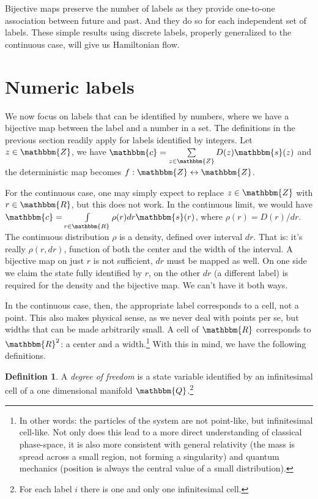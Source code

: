 \documentclass[aps,pra,10pt,twocolumn,floatfix,nofootinbib]{revtex4-1}
\theoremstyle{definition}
\newtheorem{defn}[thm]{Definition}
\begin{document}
Bijective maps preserve the number of labels as they provide one-to-one association between future and past. And they do so for each independent set of labels. These simple results using discrete labels, properly generalized to the continuous case, will give us Hamiltonian flow.

\section{Numeric labels}

We now focus on labels that can be identified by numbers, where we have a bijective map between the label and a number in a set. The definitions in the previous section readily apply for labels identified by integers. Let $z \in \mathbbm{Z}$, we have $\mathbbm{c}=\sum\limits_{z \in \mathbbm{Z}} D(z) \mathbbm{s}(z)$ and the deterministic map becomes $f:\mathbbm{Z} \leftrightarrow \mathbbm{Z}$.

For the continuous case, one may simply expect to replace $z \in \mathbbm{Z}$ with $r \in \mathbbm{R}$, but this does not work. In the continuous limit, we would have $\mathbbm{c}=\int\limits_{r \in \mathbbm{R}} \rho(r) dr \mathbbm{s}(r)$, where $\rho(r) = D(r) / dr$. The continuous distribution $\rho$ is a density, defined over interval $dr$. That is: it's really $\rho(r, dr)$, function of both the center and the width of the interval. A bijective map on just $r$ is not sufficient, $dr$ must be mapped as well. On one side we claim the state fully identified by $r$, on the other $dr$ (a different label) is required for the density and the bijective map. We can't have it both ways.

In the continuous case, then, the appropriate label corresponds to a cell, not a point. This also makes physical sense, as we never deal with points per se, but widths that can be made arbitrarily small. A cell of $\mathbbm{R}$ corresponds to $\mathbbm{R}^2$: a center and a width.\footnote{In other words: the particles of the system are not point-like, but infinitesimal cell-like. Not only does this lead to a more direct understanding of classical phase-space, it is also more consistent with general relativity (the mass is spread across a small region, not forming a singularity) and quantum mechanics (position is always the central value of a small distribution).} With this in mind, we have the following definitions.

\begin{defn}\label{sdof}
A \emph{degree of freedom} is a state variable identified by an infinitesimal cell of a one dimensional manifold $\mathbbm{Q}$.\footnote{For each label $i$ there is one and only one infinitesimal cell.}
\end{defn}
\end{document}
